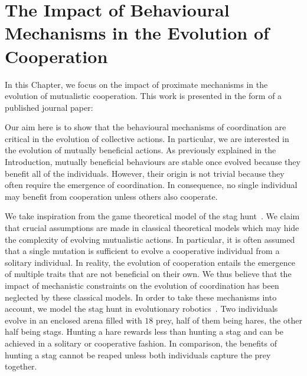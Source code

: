\chapter{The Impact of Behavioural Mechanisms in the Evolution of Cooperation}
\label{chapter:C1_article1}

\setcounter{secnumdepth}{0}
\setcounter{minitocdepth}{1}
\minitoc[n] %

In this Chapter, we focus on the impact of proximate mechanisms in the evolution of mutualistic cooperation. This work is presented in the form of a published journal paper:

\begin{quote}
\end{quote}

Our aim here is to show that the behavioural mechanisms of coordination are critical in the evolution of collective actions. In particular, we are interested in the evolution of mutually beneficial actions. As previously explained in the Introduction, mutually beneficial behaviours are stable once evolved because they benefit all of the individuals. However, their origin is not trivial because they often require the emergence of coordination. In consequence, no single individual may benefit from cooperation unless others also cooperate.

We take inspiration from the game theoretical model of the stag hunt~\parencite{Skyrms2004}. We claim that crucial assumptions are made in classical theoretical models which may hide the complexity of evolving mutualistic actions. In particular, it is often assumed that a single mutation is sufficient to evolve a cooperative individual from a solitary individual. In reality, the evolution of cooperation entails the emergence of multiple traits that are not beneficial on their own. We thus believe that the impact of mechanistic constraints on the evolution of coordination has been neglected by these classical models. In order to take these mechanisms into account, we model the stag hunt in evolutionary robotics~\parencite{Nolfi2000, Doncieux2015a}. Two individuals evolve in an enclosed arena filled with $18$ prey, half of them being hares, the other half being stags. Hunting a hare rewards less than hunting a stag and can be achieved in a solitary or cooperative fashion. In comparison, the benefits of hunting a stag cannot be reaped unless both individuals capture the prey together.


